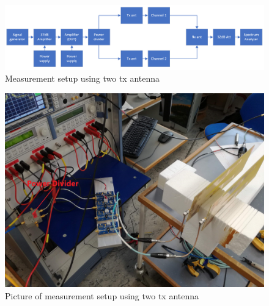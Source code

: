 \begin{figure}[H]
\centering 
\includegraphics[scale = 0.4]{figures/measurement/cree/two2one_draw.png}
\caption{Measurement setup using two tx antenna}
\label{fig:Meas_setup_draw_cree1}
\end{figure} 


\begin{figure}[H]
\centering 
\includegraphics[scale = 0.1]{figures/measurement/cree/two2one.jpg}
\caption{Picture of measurement setup using two tx antenna}
\label{fig:Meas_setup_cree1}
\end{figure} 

